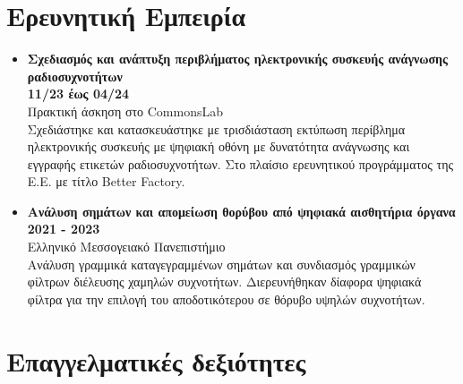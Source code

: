 \documentclass[a4paper,9pt]{extarticle}
\begin{document}
\section*{Ερευνητική Εμπειρία}
\begin{itemize}
\item{\textbf{Σχεδιασμός και ανάπτυξη περιβλήματος ηλεκτρονικής συσκευής ανάγνωσης ραδιοσυχνοτήτων}} \\
        \textbf{11/23 έως 04/24} \\
        Πρακτική άσκηση στο CommonsLab \\
        Σχεδιάστηκε και κατασκευάστηκε με τρισδιάσταση εκτύπωση περίβλημα
        ηλεκτρονικής συσκευής με ψηφιακή οθόνη με δυνατότητα ανάγνωσης και
        εγγραφής ετικετών ραδιοσυχνοτήτων. Στο πλαίσιο ερευνητικού προγράμματος
        της Ε.Ε. με τίτλο Better Factory.\\
\item{\textbf{Ανάλυση σημάτων και απομείωση θορύβου από ψηφιακά αισθητήρια όργανα}}\\
        \textbf{2021 - 2023} \\
        Ελληνικό Μεσσογειακό Πανεπιστήμιο \\
        Ανάλυση γραμμικά καταγεγραμμένων σημάτων και συνδιασμός γραμμικών
        φίλτρων διέλευσης χαμηλών συχνοτήτων. Διερευνήθηκαν δίαφορα ψηφιακά φίλτρα
        για την επιλογή του αποδοτικότερου σε θόρυβο υψηλών συχνοτήτων. \\
\end{itemize}


\section*{Επαγγελματικές δεξιότητες}
\end{document}
